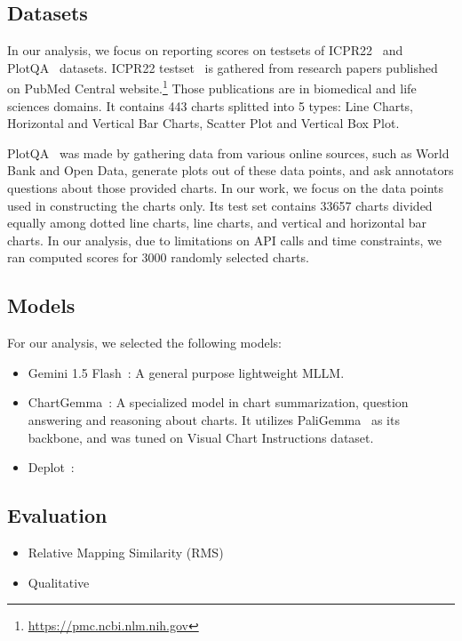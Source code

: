 \documentclass[
	letterpaper, %
]{jdf}
\begin{document}
\subsection{Datasets}
In our analysis, we focus on reporting scores on testsets of ICPR22~\cite{rousseau2023pattern} and PlotQA~\cite{methani2020plotqa} datasets.
ICPR22 testset~\cite{rousseau2023pattern} is gathered from research papers published on PubMed Central website.\footnote{\href{https://pmc.ncbi.nlm.nih.gov}{https://pmc.ncbi.nlm.nih.gov}}
Those publications are in biomedical and life sciences domains.
It contains 443 charts splitted into 5 types: Line Charts, Horizontal and Vertical Bar Charts, Scatter Plot and Vertical Box Plot.

PlotQA~\cite{methani2020plotqa} was made by gathering data from various online sources, such as World Bank and Open Data, generate plots out of these data points, and ask annotators questions about those provided charts.
In our work, we focus on the data points used in constructing the charts only.
Its test set contains 33657 charts divided equally among dotted line charts, line charts, and vertical and horizontal bar charts.
In our analysis, due to limitations on API calls and time constraints, we ran computed scores for 3000 randomly selected charts.

\subsection{Models}\label{ssect:models}
For our analysis, we selected the following models:
\begin{itemize}
  \item Gemini 1.5 Flash~\cite{team2024gemini}: A general purpose lightweight MLLM.
     \item ChartGemma~\cite{masry2024chartgemma}: A specialized model in chart summarization, question answering and reasoning about charts.
       It utilizes PaliGemma~\cite{beyer2024paligemma} as its backbone, and was tuned on Visual Chart Instructions dataset.
     \item Deplot~\cite{liu2022deplot}: 
       \end{itemize}
\subsection{Evaluation}
\begin{itemize}
  \item Relative Mapping Similarity (RMS)
  \item Qualitative
       \end{itemize}
\end{document}

